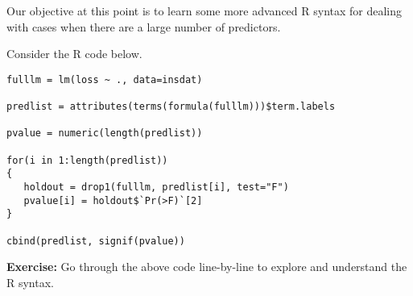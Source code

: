 \documentclass{report}
\begin{document}
Our objective at this point is to learn some more advanced R syntax for
dealing with cases when there are a large number of predictors.

\newpage
Consider the R code below.

\vspace{-.4in}
\large
\begin{verbatim}
fulllm = lm(loss ~ ., data=insdat)

predlist = attributes(terms(formula(fulllm)))$term.labels

pvalue = numeric(length(predlist))

for(i in 1:length(predlist))
{
   holdout = drop1(fulllm, predlist[i], test="F")
   pvalue[i] = holdout$`Pr(>F)`[2]
}

cbind(predlist, signif(pvalue))
\end{verbatim}
\Large

\textcolor{qcol}{{\bf Exercise:} Go through the above code
line-by-line to explore and understand the R syntax.}

\end{document}
